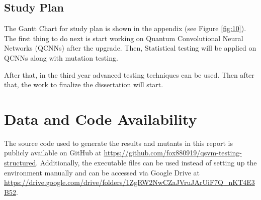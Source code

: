 \documentclass[12pt,a4paper]{article}
\begin{document}
	\subsection{Study Plan}
	
	The Gantt Chart for study plan is shown in the appendix (see Figure \ref{fig:10}). The first thing to do next is start working on Quantum Convolutional Neural Networks (QCNNs) after the upgrade. Then, Statistical testing will be applied on QCNNs along with mutation testing. 
	
	After that, in the third year advanced testing techniques can be used. Then after that, the work to finalize the dissertation will start.
	

	

	
	
	\section*{Data and Code Availability}
	The source code used to generate the results and mutants in this report is publicly available on GitHub at \url{https://github.com/fox880919/qsvm-testing-structured}. Additionally, the executable files can be used instead of setting up the environment manually and can be accessed via Google Drive at \url{https://drive.google.com/drive/folders/1ZgRW2NwCZaJVruJArUiF7Q_nKT4E3B52}.
	
	
		
	
	\clearpage 
	
\end{document}
